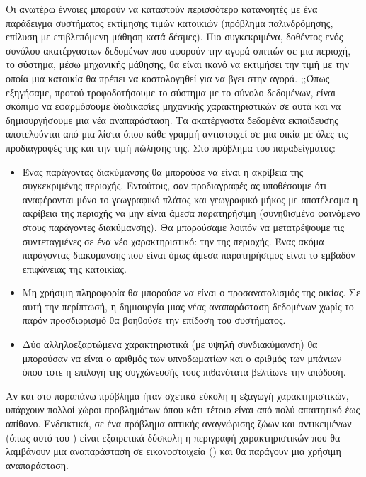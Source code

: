 Οι ανωτέρω έννοιες μπορούν να καταστούν περισσότερο κατανοητές με ένα παράδειγμα συστήματος εκτίμησης τιμών κατοικιών\cite{geron2019hands} (πρόβλημα παλινδρόμησης, επίλυση με επιβλεπόμενη μάθηση κατά δέσμες). Πιο συγκεκριμένα, δοθέντος ενός συνόλου ακατέργαστων δεδομένων που αφορούν την αγορά σπιτιών σε μια περιοχή, το σύστημα, μέσω μηχανικής μάθησης, θα είναι ικανό να εκτιμήσει την τιμή με την οποία μια κατοικία θα πρέπει να κοστολογηθεί για να βγει στην αγορά. ;;Όπως εξηγήσαμε, προτού τροφοδοτήσουμε το σύστημα με το σύνολο δεδομένων, είναι σκόπιμο να εφαρμόσουμε διαδικασίες μηχανικής χαρακτηριστικών σε αυτά και να δημιουργήσουμε μια νέα αναπαράσταση. Τα ακατέργαστα δεδομένα εκπαίδευσης αποτελούνται από μια λίστα όπου κάθε γραμμή αντιστοιχεί σε μια οικία με όλες τις προδιαγραφές της και την τιμή πώλησής της. Στο πρόβλημα του παραδείγματος:
\begin{itemize}
    \item  Ένας παράγοντας διακύμανσης θα μπορούσε να είναι η ακρίβεια της συγκεκριμένης περιοχής. Εντούτοις, σαν προδιαγραφές ας υποθέσουμε ότι αναφέρονται μόνο το γεωγραφικό πλάτος και γεωγραφικό μήκος με αποτέλεσμα η ακρίβεια της περιοχής να μην είναι άμεσα παρατηρήσιμη (συνηθισμένο φαινόμενο στους παράγοντες διακύμανσης). Θα μπορούσαμε λοιπόν να μετατρέψουμε τις συντεταγμένες σε ένα νέο χαρακτηριστικό: την  της περιοχής. Ένας ακόμα παράγοντας διακύμανσης που είναι όμως άμεσα παρατηρήσιμος είναι το εμβαδόν επιφάνειας της κατοικίας.
 \item Μη χρήσιμη πληροφορία θα μπορούσε να είναι ο προσανατολισμός της οικίας. Σε αυτή την περίπτωσή, η δημιουργία μιας νέας αναπαράσταση δεδομένων χωρίς το παρόν προσδιορισμό θα βοηθούσε την επίδοση του συστήματος. 
 \item Δύο αλληλοεξαρτώμενα χαρακτηριστικά (με υψηλή συν\textemdash διακύμανση) θα μπορούσαν να είναι ο αριθμός των υπνοδωματίων και ο αριθμός των μπάνιων όπου τότε η επιλογή της συγχώνευσής τους πιθανότατα βελτίωνε την απόδοση. 
\end{itemize}
\par

Αν και στο παραπάνω πρόβλημα ήταν σχετικά εύκολη η  εξαγωγή χαρακτηριστικών, υπάρχουν πολλοί χώροι προβλημάτων όπου κάτι τέτοιο είναι από πολύ απαιτητικό έως απίθανο. Ενδεικτικά, σε ένα πρόβλημα οπτικής αναγνώρισης ζώων και αντικειμένων (όπως αυτό του \cite{cifar10}) είναι εξαιρετικά δύσκολη η περιγραφή χαρακτηριστικών που θα λαμβάνουν μια αναπαράσταση σε εικονοστοιχεία () και θα παράγουν μια χρήσιμη αναπαράσταση. \par

